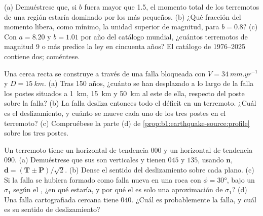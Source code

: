 \begin{exercise}[$\star\star\star$]\label{exo:b1:earthquake-source:10}
(a) Demuéstrese que, si $b$ fuera mayor que 1.5, el momento total de los terremotos de una región estaría dominado por los más pequeños.
(b) ¿Qué fracción del momento libera, como mínimo, la unidad superior de magnitud, para $b = 0.8$? (c) Con $a = 8.20$ y $b = 1.01$ por año
del catálogo mundial, ¿cuántos terremotos de magnitud 9 o más predice la ley en cincuenta años? El catálogo de 1976--2025 contiene dos;
coméntese.
\end{exercise}

\begin{exercise}[$\star\star\star$]\label{exo:b1:earthquake-source:11}
Una cerca recta se construye a través de una falla  bloqueada con $V =
\qty{34}{mm.yr^{-1}}$ y $D = \qty{15}{km}$. (a) Tras 150 años,
¿cuánto se han desplazado a lo largo de la falla los postes situados a \qty{1}{km}, \qty{15}{km} y \qty{50}{km} al este de ella, respecto del poste
sobre la falla? (b) La falla desliza entonces todo el déficit en un terremoto. ¿Cuál es el deslizamiento, y cuánto se mueve cada uno de los tres
postes en el terremoto? (c) Compruébese la parte (d) de \cref{prop:b1:earthquake-source:profile} sobre los tres postes.
\end{exercise}

\begin{exercise}[$\star\star\star$]\label{exo:b1:earthquake-source:12}
Un terremoto tiene un  horizontal de tendencia $000$ y un  horizontal de tendencia $090$. (a) Demuéstrese que sus  son
verticales y tienen  $045$ y $135$, usando $\mathbf n$, $\mathbf d = (\mathbf T \pm \mathbf P)/\sqrt2$. (b) Dense el sentido del deslizamiento
sobre cada plano. (c) Si la falla se hubiera formado como falla nueva en una roca con $\phi = \ang{30}$, bajo un $\sigma_1$ según el , ¿en qué
 estaría, y por qué el  es solo una aproximación de $\sigma_1$? (d) Una falla cartografiada cercana tiene  $040$. ¿Cuál  es probablemente la falla, y cuál es su sentido de deslizamiento?
\end{exercise}

